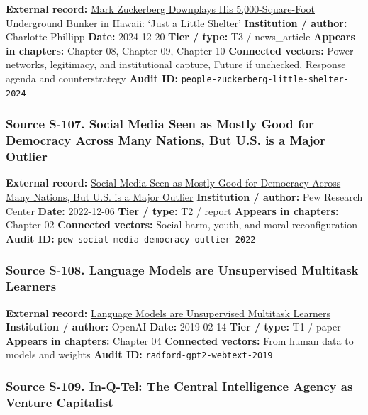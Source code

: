 \documentclass[
  american,
  11pt,
  letterpaper,
]{article}
\begin{document}
\textbf{External record:}
\href{https://people.com/mark-zuckerberg-hawaii-bunker-5000-square-feet-8765376}{Mark
Zuckerberg Downplays His 5,000-Square-Foot Underground Bunker in Hawaii:
`Just a Little Shelter'} \textbf{Institution / author:} Charlotte
Phillipp \textbf{Date:} 2024-12-20 \textbf{Tier / type:} T3 /
news\_article \textbf{Appears in chapters:} Chapter 08, Chapter 09,
Chapter 10 \textbf{Connected vectors:} Power networks, legitimacy, and
institutional capture, Future if unchecked, Response agenda and
counterstrategy \textbf{Audit ID:}
\texttt{people-zuckerberg-little-shelter-2024}

\subsubsection{Source S-107. Social Media Seen as Mostly Good for
Democracy Across Many Nations, But U.S. is a Major
Outlier}\label{source-s-107-social-media-seen-as-mostly-good-for-democracy-across-many-nations-but-u-s-is-a-major-outlier}

\textbf{External record:}
\href{https://www.pewresearch.org/global/2022/12/06/social-media-seen-as-mostly-good-for-democracy-across-many-nations-but-u-s-is-a-major-outlier/}{Social
Media Seen as Mostly Good for Democracy Across Many Nations, But U.S. is
a Major Outlier} \textbf{Institution / author:} Pew Research Center
\textbf{Date:} 2022-12-06 \textbf{Tier / type:} T2 / report
\textbf{Appears in chapters:} Chapter 02 \textbf{Connected vectors:}
Social harm, youth, and moral reconfiguration \textbf{Audit ID:}
\texttt{pew-social-media-democracy-outlier-2022}

\subsubsection{Source S-108. Language Models are Unsupervised Multitask
Learners}\label{source-s-108-language-models-are-unsupervised-multitask-learners}

\textbf{External record:}
\href{https://cdn.openai.com/better-language-models/language_models_are_unsupervised_multitask_learners.pdf}{Language
Models are Unsupervised Multitask Learners} \textbf{Institution /
author:} OpenAI \textbf{Date:} 2019-02-14 \textbf{Tier / type:} T1 /
paper \textbf{Appears in chapters:} Chapter 04 \textbf{Connected
vectors:} From human data to models and weights \textbf{Audit ID:}
\texttt{radford-gpt2-webtext-2019}

\subsubsection{Source S-109. In-Q-Tel: The Central Intelligence Agency
as Venture
Capitalist}\label{source-s-109-in-q-tel-the-central-intelligence-agency-as-venture-capitalist}
\end{document}
